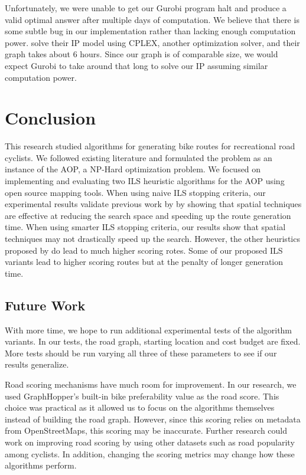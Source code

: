 \documentclass[honors]{union-cs-thesis}
\begin{document}
Unfortunately, we were unable to get our Gurobi program halt and produce a valid optimal answer after multiple days of computation. We believe that there is some subtle bug in our implementation rather than lacking enough computation power. \citeauthor{verbeeck2014extension} solve their IP model using CPLEX, another optimization solver, and their graph takes about 6 hours. Since our graph is of comparable size, we would expect Gurobi to take around that long to solve our IP assuming similar computation power.

\section{Conclusion}
This research studied algorithms for generating bike routes for recreational road cyclists. We followed existing literature and formulated the problem as an instance of the AOP, a NP-Hard optimization problem. We focused on implementing and evaluating two ILS heuristic algorithms \cite{verbeeck2014extension} \cite{lu2015arc} for the AOP using open source mapping tools. When using naive ILS stopping criteria, our experimental results validate previous work by \cite{lu2015arc} by showing that spatial techniques are effective at reducing the search space and speeding up the route generation time. When using smarter ILS stopping criteria, our results show that spatial techniques may not drastically speed up the search. However, the other heuristics proposed by \cite{lu2015arc} do lead to much higher scoring rotes. Some of our proposed ILS variants lead to higher scoring routes but at the penalty of longer generation time.

\subsection{Future Work}
With more time, we hope to run additional experimental tests of the algorithm variants. In our tests, the road graph, starting location and cost budget are fixed. More tests should be run varying all three of these parameters to see if our results generalize.  

Road scoring mechanisms have much room for improvement. In our research, we used GraphHopper's built-in bike preferability value as the road score. This choice was practical as it allowed us to focus on the algorithms themselves instead of building the road graph. However, since this scoring relies on metadata from OpenStreetMaps, this scoring may be inaccurate. Further research could work on improving road scoring by using other datasets such as road popularity among cyclists. In addition, changing the scoring metrics may change how these algorithms perform.
\end{document}
